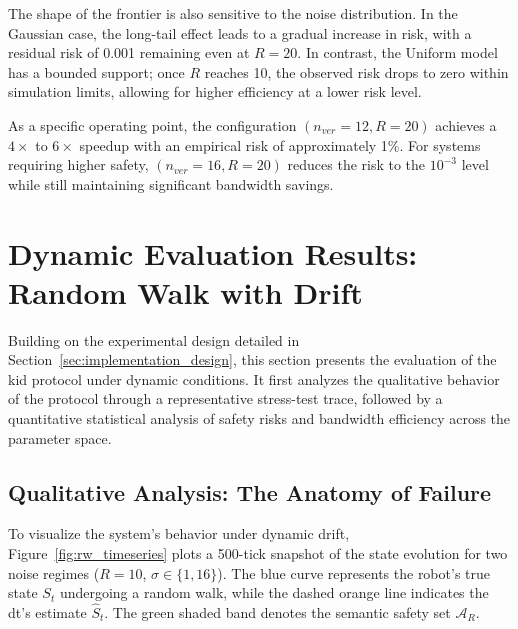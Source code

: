 The shape of the frontier is also sensitive to the noise distribution. In the Gaussian case, the long-tail effect leads to a gradual increase in risk, with a residual risk of 0.001 remaining even at $R = 20$. In contrast, the Uniform model has a bounded support; once $R$ reaches 10, the observed risk drops to zero within simulation limits, allowing for higher efficiency at a lower risk level.

As a specific operating point, the configuration $(n_{ver} = 12, R = 20)$ achieves a $4\times$ to $6\times$ speedup with an empirical risk of approximately 1\%. For systems requiring higher safety, $(n_{ver} = 16, R = 20)$ reduces the risk to the $10^{-3}$ level while still maintaining significant bandwidth savings. 
\section{Dynamic Evaluation Results: Random Walk with Drift}
\label{sec:dynamic_results}

Building on the experimental design detailed in Section~\ref{sec:implementation_design}, this section presents the evaluation of the \gls{kid} protocol under dynamic conditions. It first analyzes the qualitative behavior of the protocol through a representative stress-test trace, followed by a quantitative statistical analysis of safety risks and bandwidth efficiency across the parameter space.

\subsection{Qualitative Analysis: The Anatomy of Failure}
\label{subsec:trace_analysis}

To visualize the system's behavior under dynamic drift, Figure~\ref{fig:rw_timeseries} plots a 500-tick snapshot of the state evolution for two noise regimes ($R=10$, $\sigma \in \{1,16\}$). The blue curve represents the robot's true state $S_t$ undergoing a random walk, while the dashed orange line indicates the \gls{dt}'s estimate $\hat{S}_t$. The green shaded band denotes the semantic safety set $\mathcal{A}_R$.

